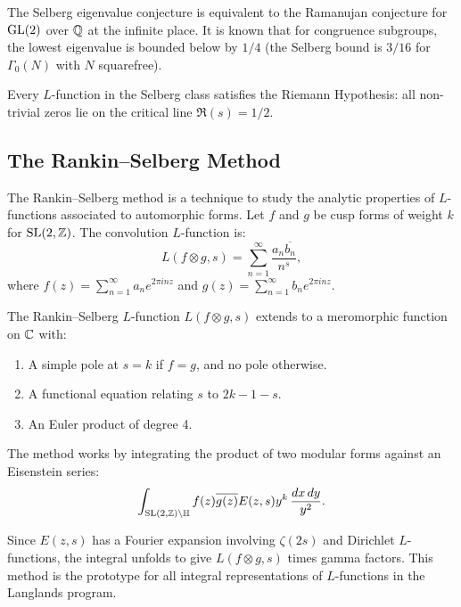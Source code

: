 The Selberg eigenvalue conjecture is equivalent to the Ramanujan conjecture for \(\operatorname{GL}(2)\) over \(\mathbb{Q}\) at the infinite place. It is known that for congruence subgroups, the lowest eigenvalue is bounded below by \(1/4\) (the Selberg bound is \(3/16\) for \(\Gamma_0(N)\) with \(N\) squarefree).

\begin{conjecture}
Every \(L\)-function in the Selberg class satisfies the Riemann Hypothesis: all non-trivial zeros lie on the critical line \(\Re(s) = 1/2\).
\end{conjecture}

\subsection{The Rankin--Selberg Method}

The Rankin--Selberg method is a technique to study the analytic properties of \(L\)-functions associated to automorphic forms. Let \(f\) and \(g\) be cusp forms of weight \(k\) for \(\operatorname{SL}(2,\mathbb{Z})\). The convolution \(L\)-function is:
\[
L(f \otimes g, s) = \sum_{n=1}^{\infty} \frac{a_n \overline{b_n}}{n^s},
\]
where \(f(z) = \sum_{n=1}^{\infty} a_n e^{2\pi i n z}\) and \(g(z) = \sum_{n=1}^{\infty} b_n e^{2\pi i n z}\).

\begin{theorem}
The Rankin--Selberg \(L\)-function \(L(f \otimes g, s)\) extends to a meromorphic function on \(\mathbb{C}\) with:
\begin{enumerate}
    \item A simple pole at \(s = k\) if \(f = g\), and no pole otherwise.
    \item A functional equation relating \(s\) to \(2k - 1 - s\).
    \item An Euler product of degree 4.
\end{enumerate}
\end{theorem}

The method works by integrating the product of two modular forms against an Eisenstein series:
\[
\int_{\operatorname{SL}(2,\mathbb{Z}) \backslash \mathbb{H}} f(z) \overline{g(z)} E(z, s) y^k \, \frac{dx\,dy}{y^2}.
\]

Since \(E(z,s)\) has a Fourier expansion involving \(\zeta(2s)\) and Dirichlet \(L\)-functions, the integral unfolds to give \(L(f \otimes g, s)\) times gamma factors. This method is the prototype for all integral representations of \(L\)-functions in the Langlands program.

